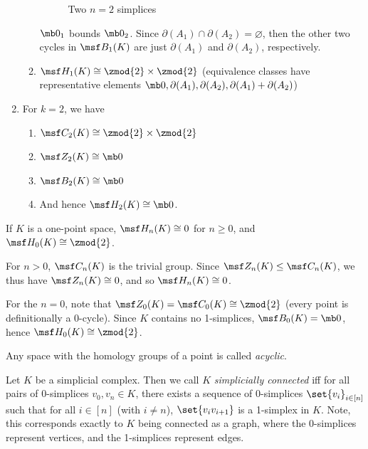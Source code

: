 \begin{solution}
\begin{enumerate}[label=(\roman*)]
\begin{enumerate}
\begin{figure}[H]
        \caption{Two $n=2$ simplices}
      \end{figure}
      $\mb 0_1$ bounds $\mb 0_2$. Since $\partial(A_1) \cap \partial(A_2) =
      \varnothing$, then the other two cycles in $\msf B_1(K)$ are just
      $\partial(A_1)$ and $\partial(A_2)$, respectively.
    \item $\msf H_1(K) \cong \zmod{2} \times \zmod{2}$ (equivalence classes
      have representative elements $\mb 0, \partial(A_1), \partial(A_2),
      \partial(A_1) + \partial(A_2)$)
    \end{enumerate}
  \item For $k=2$, we have
    \begin{enumerate}
    \item $\msf C_2(K) \cong \zmod{2} \times \zmod{2}$
    \item $\msf Z_2(K) \cong \mb 0$
    \item $\msf B_2(K) \cong \mb 0$
    \item And hence $\msf H_2(K) \cong \mb 0$.
    \end{enumerate}
  \end{enumerate}
\end{solution}
\begin{problem}[16.7]
  If $K$ is a one-point space, $\msf H_n(K) \cong 0$ for $n \geq 0$, and $\msf
  H_0(K) \cong \zmod{2}$.
\end{problem}
\begin{solution}
  For $n > 0$, $\msf C_n(K)$ is the trivial group. Since $\msf Z_n(K) \leq \msf
  C_n(K)$, we thus have $\msf Z_n(K) \cong 0$, and so $\msf H_n(K) \cong 0$.

  For the $n = 0$, note that $\msf Z_0(K) = \msf C_0(K) \cong \zmod{2}$ (every
  point is definitionally a 0-cycle). Since $K$ contains no 1-simplices, $\msf
  B_0(K) = \mb 0$, hence $\msf H_0(K) \cong \zmod{2}$.
\end{solution}
\begin{definition}[Acyclic]
  Any space with the homology groups of a point is called \emph{acyclic}.
\end{definition}
\begin{definition}
  Let $K$ be a simplicial complex. Then we call $K$ \emph{simplicially
    connected} iff for all pairs of 0-simplices $v_0, v_n \in K$, there exists a
  sequence of 0-simplices $\set{v_i}_{i\in [n]}$ such that for all $i \in [n]$
  (with $i \neq n$), $\set{v_iv_{i+1}}$ is a 1-simplex in $K$. Note, this
  corresponds exactly to $K$ being connected as a graph, where the 0-simplices
  represent vertices, and the 1-simplices represent edges.
\end{definition}
